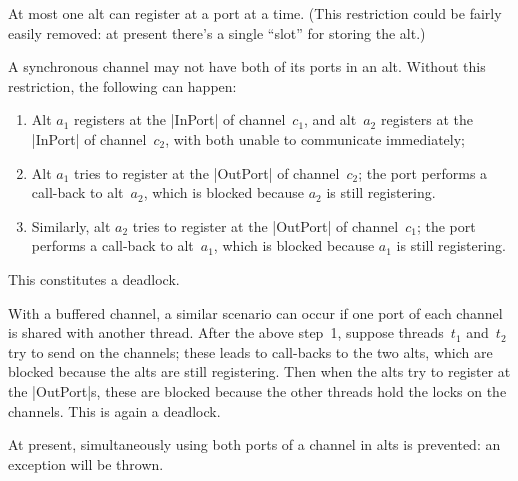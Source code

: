 \documentclass[12pt,a4paper]{article}
\begin{document}
At most one alt can register at a port at a time.  (This restriction could be
fairly easily removed: at present there's a single ``slot'' for storing the
alt.)


A synchronous channel may not have both of its ports in an alt.  Without this
restriction, the following can happen: 
\begin{enumerate}
\item Alt $a_1$ registers at the |InPort| of channel~$c_1$, and alt~$a_2$
  registers at the |InPort| of channel~$c_2$, with both unable to communicate
  immediately;

\item Alt $a_1$ tries to register at the |OutPort| of channel~$c_2$; the port
  performs a call-back to alt~$a_2$, which is blocked because $a_2$ is still
  registering.

\item Similarly, alt $a_2$ tries to register at the |OutPort| of
  channel~$c_1$; the port performs a call-back to alt~$a_1$, which is blocked
  because $a_1$ is still registering.
\end{enumerate}
%
This constitutes a deadlock. 

With a buffered channel, a similar scenario can occur if one port of each
channel is shared with another thread.  After the above step~1, suppose
threads~$t_1$ and~$t_2$ try to send on the channels; these leads to call-backs
to the two alts, which are blocked because the alts are still registering.
Then when the alts try to register at the |OutPort|s, these are blocked
because the other threads hold the locks on the channels.  This is again a
deadlock. 

At present, simultaneously using both ports of a channel in alts is prevented:
an exception will be thrown.


\end{document}
